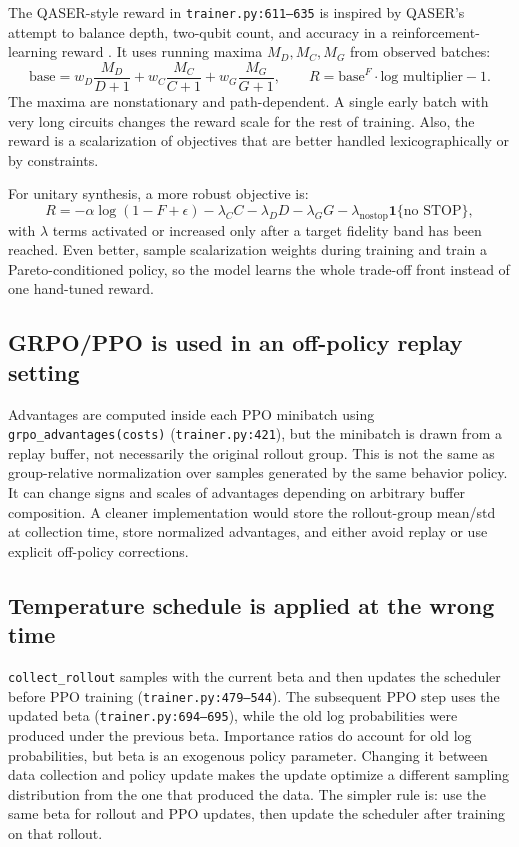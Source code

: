 \documentclass[11pt,a4paper]{article}
\begin{document}
The QASER-style reward in \texttt{trainer.py:611--635} is inspired by
QASER's attempt to balance depth, two-qubit count, and accuracy in a
reinforcement-learning reward \cite{qaser2025}. It uses running maxima
$M_D,M_C,M_G$ from observed batches:
\[
  \mathrm{base}
  =
  w_D\frac{M_D}{D+1}
  +
  w_C\frac{M_C}{C+1}
  +
  w_G\frac{M_G}{G+1},
  \qquad
  R=\mathrm{base}^{F}\cdot \text{log multiplier}-1.
\]
The maxima are nonstationary and path-dependent. A single early batch with
very long circuits changes the reward scale for the rest of training. Also,
the reward is a scalarization of objectives that are better handled
lexicographically or by constraints.

For unitary synthesis, a more robust objective is:
\[
  R =
  -\alpha \log(1-F+\epsilon)
  - \lambda_C C - \lambda_D D - \lambda_G G
  - \lambda_{\mathrm{nostop}}\mathbf{1}\{\text{no STOP}\},
\]
with $\lambda$ terms activated or increased only after a target fidelity band
has been reached. Even better, sample scalarization weights during training
and train a Pareto-conditioned policy, so the model learns the whole trade-off
front instead of one hand-tuned reward.

\subsection{GRPO/PPO is used in an off-policy replay setting}

Advantages are computed inside each PPO minibatch using
\texttt{grpo\_advantages(costs)} (\texttt{trainer.py:421}), but the minibatch
is drawn from a replay buffer, not necessarily the original rollout group. This
is not the same as group-relative normalization over samples generated by the
same behavior policy. It can change signs and scales of advantages depending
on arbitrary buffer composition. A cleaner implementation would store the
rollout-group mean/std at collection time, store normalized advantages, and
either avoid replay or use explicit off-policy corrections.

\subsection{Temperature schedule is applied at the wrong time}

\texttt{collect\_rollout} samples with the current beta and then updates the
scheduler before PPO training (\texttt{trainer.py:479--544}). The subsequent
PPO step uses the updated beta (\texttt{trainer.py:694--695}), while the old
log probabilities were produced under the previous beta. Importance ratios do
account for old log probabilities, but beta is an exogenous policy parameter.
Changing it between data collection and policy update makes the update optimize
a different sampling distribution from the one that produced the data. The
simpler rule is: use the same beta for rollout and PPO updates, then update the
scheduler after training on that rollout.
\end{document}
